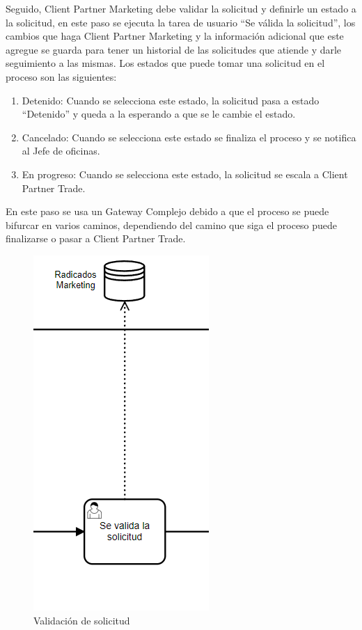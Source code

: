 Seguido, Client Partner Marketing debe validar la solicitud y definirle un estado a la solicitud, en este paso se ejecuta la tarea de usuario ``Se válida la solicitud'', los cambios que haga Client Partner Marketing y la información adicional que este agregue se guarda para tener un historial de las solicitudes que atiende y darle seguimiento a las mismas. Los estados que puede tomar una solicitud en el proceso son las siguientes: 
\begin{enumerate}
	\item Detenido: Cuando se selecciona este estado, la solicitud pasa a estado ``Detenido'' y queda a la esperando a que se le cambie el estado.
	\item Cancelado: Cuando se selecciona este estado se finaliza el proceso y se notifica al Jefe de oficinas.
	\item En progreso: Cuando se selecciona este estado, la solicitud se escala a Client Partner Trade.
\end{enumerate}
En este paso se usa un Gateway Complejo debido a que el proceso se puede bifurcar en varios caminos, dependiendo del camino que siga el proceso puede finalizarse o pasar a Client Partner Trade.
\begin{figure}[H]
	\centering
	\includegraphics[scale=0.5]{Capitulo4/imagenes/11.png}
	\caption{Validación de solicitud}
	\label{ValSol}
\end{figure}


